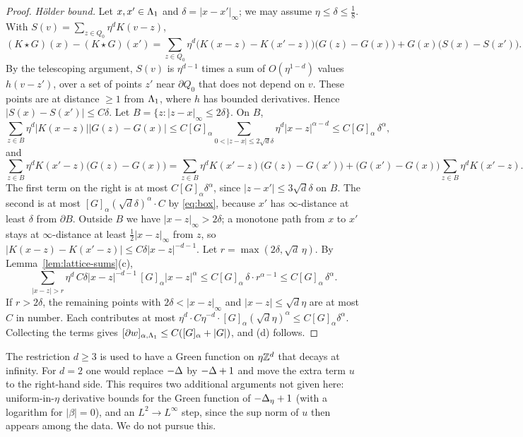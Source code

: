 \begin{proof}
\emph{H\"older bound.} Let $x,x'\in\Lambda_1$ and $\delta=|x-x'|_\infty$; we may assume $\eta\le\delta\le\frac18$. With $S(v)=\sum_{z\in Q_0}\eta^dK(v-z)$,
\[
(K\star G)(x)-(K\star G)(x')=\sum_{z\in Q_0}\eta^d\big(K(x-z)-K(x'-z)\big)\big(G(z)-G(x)\big)+G(x)\big(S(x)-S(x')\big).
\]
By the telescoping argument, $S(v)$ is $\eta^{d-1}$ times a sum of $O(\eta^{1-d})$ values $h(v-z')$, over a set of points $z'$ near $\partial Q_0$ that does not depend on $v$. These points are at distance $\ge1$ from $\Lambda_1$, where $h$ has bounded derivatives. Hence $|S(x)-S(x')|\le C\delta$. Let $B=\{z:|z-x|_\infty\le2\delta\}$. On $B$,
\[
\sum_{z\in B}\eta^d|K(x-z)||G(z)-G(x)|\le C[G]_\alpha\sum_{0<|z-x|\le2\sqrt d\delta}\eta^d|x-z|^{\alpha-d}\le C[G]_\alpha\,\delta^\alpha,
\]
and
\[
\sum_{z\in B}\eta^dK(x'-z)\big(G(z)-G(x)\big)=\sum_{z\in B}\eta^dK(x'-z)\big(G(z)-G(x')\big)+\big(G(x')-G(x)\big)\sum_{z\in B}\eta^dK(x'-z).
\]
The first term on the right is at most $C[G]_\alpha\delta^\alpha$, since $|z-x'|\le3\sqrt d\delta$ on $B$. The second is at most $[G]_\alpha(\sqrt d\delta)^\alpha\cdot C$ by \eqref{eq:box}, because $x'$ has $\infty$-distance at least $\delta$ from $\partial B$. Outside $B$ we have $|x-z|_\infty>2\delta$; a monotone path from $x$ to $x'$ stays at $\infty$-distance at least $\frac12|x-z|_\infty$ from $z$, so $|K(x-z)-K(x'-z)|\le C\delta|x-z|^{-d-1}$. Let $r=\max(2\delta,\sqrt d\,\eta)$. By Lemma~\ref{lem:lattice-sums}(c),
\[
\sum_{|x-z|>r}\eta^d\,C\delta|x-z|^{-d-1}\,[G]_\alpha|x-z|^\alpha\le C[G]_\alpha\,\delta\cdot r^{\alpha-1}\le C[G]_\alpha\,\delta^\alpha .
\]
If $r>2\delta$, the remaining points with $2\delta<|x-z|_\infty$ and $|x-z|\le\sqrt d\eta$ are at most $C$ in number. Each contributes at most $\eta^d\cdot C\eta^{-d}\cdot[G]_\alpha(\sqrt d\eta)^\alpha\le C[G]_\alpha\delta^\alpha$.
Collecting the terms gives $[\partial w]_{\alpha,\Lambda_1}\le C([G]_\alpha+|G|)$, and (d) follows.
\end{proof}

\begin{remark}
The restriction $d\ge3$ is used to have a Green function on $\eta\mathbb Z^d$ that decays at infinity. For $d=2$ one would replace $-\Delta$ by $-\Delta+1$ and move the extra term $u$ to the right-hand side. This requires two additional arguments not given here: uniform-in-$\eta$ derivative bounds for the Green function of $-\Delta_\eta+1$ (with a logarithm for $|\beta|=0$), and an $L^2\to L^\infty$ step, since the sup norm of $u$ then appears among the data. We do not pursue this.
\end{remark}
